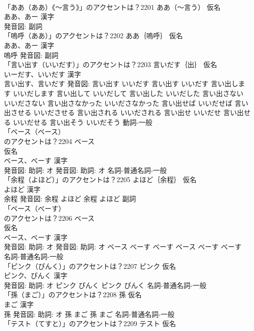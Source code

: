 \documentclass[8pt]{extreport}
\begin{document}
\begin{CJK}{UTF8}{min}
\\	「ああ（ああ）《〜言う》」のアクセントは？2201	ああ（〜言う） 仮名　
\\	ああ、あー 漢字　
\\	発音図:							副詞 
\\	「嗚呼（ああ）」のアクセントは？2202	ああ｛嗚呼｝ 仮名　
\\	ああ、あー 漢字　
\\	嗚呼 発音図:							副詞 
\\	「言い出す（いいだす）」のアクセントは？2203	言いだす｛出｝ 仮名　
\\	いーだす、いいだす 漢字　
\\	言い出す、言いだす 発音図:	言い出す いいだす		言い出す いいだす 言い出します いいだします 言い出して いいだして 言い出した いいだした 言い出さない いいださない 言い出さなかった いいださなかった 言い出せば いいだせば 言い出させる いいださせる 言い出される いいだされる 言い出せ いいだせ 言い出せる いいだせる 言い出そう いいだそう				動詞-一般 
\\	「ベース（ベース）
\\	のアクセントは？2204	ベース
\\	仮名　
\\	ベース、べーす 漢字　
\\	発音図: 助詞: オ 発音図: 助詞: オ							名詞-普通名詞-一般 
\\	「余程（よほど）」のアクセントは？2205	よほど｛余程｝ 仮名　
\\	よほど 漢字　
\\	余程 発音図:	余程 よほど		余程 よほど				副詞 
\\	「ベース（べーす）
\\	のアクセントは？2206	ベース
\\	仮名　
\\	ベース、べーす 漢字　
\\	発音図: 助詞: オ 発音図: 助詞: オ	ベース べーす べーす		ベース べーす べーす				名詞-普通名詞-一般 
\\	「ピンク（ぴんく）」のアクセントは？2207	ピンク 仮名　
\\	ピンク、ぴんく 漢字　
\\	発音図: 助詞: オ	ピンク ぴんく		ピンク ぴんく				名詞-普通名詞-一般 
\\	「孫（まご）」のアクセントは？2208	孫 仮名　
\\	まご 漢字　
\\	孫 発音図: 助詞: オ	孫 まご		孫 まご				名詞-普通名詞-一般 
\\	「テスト（てすと）」のアクセントは？2209	テスト 仮名　

\end{CJK}
\end{document}
